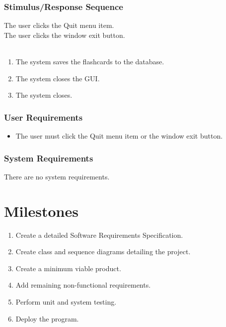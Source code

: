 \documentclass{scrreprt}
\begin{document}
    \subsection{Stimulus/Response Sequence}
        \begin{flushleft}
             The user clicks the Quit menu item. \\
             The user clicks the window exit button. \\
             \\
            \begin{enumerate}[1.]
                \item The system saves the flashcards to the database.
                \item The system closes the GUI.
                \item The system closes.
            \end{enumerate}
        \end{flushleft}

    \subsection{User Requirements}
        \begin{itemize}
            \item The user must click the Quit menu item or the window exit button.
        \end{itemize}

    \subsection{System Requirements}
        There are no system requirements.


\chapter{Milestones}
    \begin{enumerate}[1.]
        \item Create a detailed Software Requirements Specification.
        \item Create class and sequence diagrams detailing the project.
        \item Create a minimum viable product.
        \item Add remaining non-functional requirements.
        \item Perform unit and system testing.
        \item Deploy the program.
    \end{enumerate}
\end{document}
